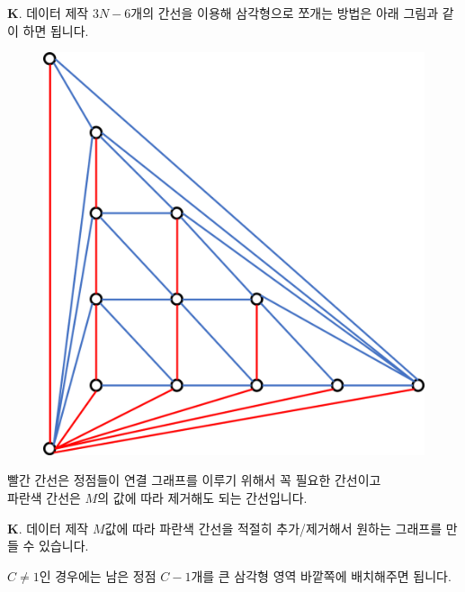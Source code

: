 \begin{frame}{\textbf{K}. 데이터 제작}
    $3N-6$개의 간선을 이용해 삼각형으로 쪼개는 방법은 아래 그림과 같이 하면 됩니다.
    
    \begin{figure}[h!]
        \centering
        \includegraphics[width=0.30\linewidth]{../images/v-e-f/sol7.png}
    \end{figure}
    
    빨간 간선은 정점들이 연결 그래프를 이루기 위해서 꼭 필요한 간선이고\\
    파란색 간선은 $M$의 값에 따라 제거해도 되는 간선입니다.
\end{frame}

\begin{frame}{\textbf{K}. 데이터 제작}
    $M$값에 따라 파란색 간선을 적절히 추가/제거해서 원하는 그래프를 만들 수 있습니다.
    
    $C \neq 1$인 경우에는 남은 정점 $C-1$개를 큰 삼각형 영역 바깥쪽에 배치해주면 됩니다.
\end{frame}